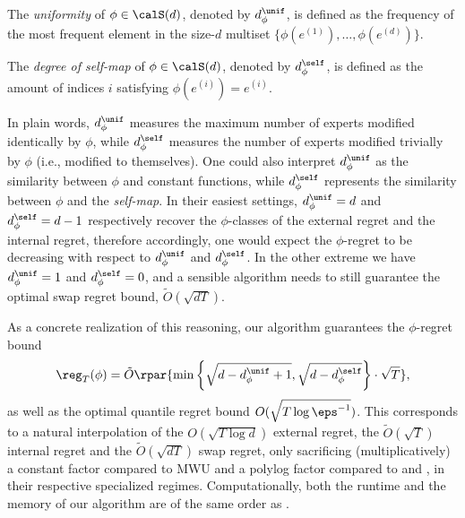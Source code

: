 \documentclass[10pt]{article}
\begin{document}
\begin{definition}[Uniformity]\label{definition:uniformity}
The \emph{uniformity} of $\phi\in\calS(d)$, denoted by $d^\unif_\phi$, is defined as the frequency of the most frequent element in the size-$d$ multiset $\{\phi(e^{(1)}),\ldots,\phi(e^{(d)})\}$. 
\end{definition}

\begin{definition}
The \emph{degree of self-map} of $\phi\in\calS(d)$, denoted by $d^\self_\phi$, is defined as the amount of indices $i$ satisfying $\phi(e^{(i)})=e^{(i)}$. 
\end{definition}

In plain words, $d^\unif_\phi$ measures the maximum number of experts modified identically by $\phi$, while $d^\self_\phi$ measures the number of experts modified trivially by $\phi$ (i.e., modified to themselves). One could also interpret $d^\unif_\phi$ as the similarity between $\phi$ and constant functions, while $d^\self_\phi$ represents the similarity between $\phi$ and the \emph{self-map}. In their easiest settings, $d^\unif_\phi=d$ and $d^\self_\phi=d-1$ respectively recover the $\phi$-classes of the external regret and the internal regret, therefore accordingly, one would expect the $\phi$-regret to be decreasing with respect to $d^\unif_\phi$ and $d^\self_\phi$. In the other extreme we have $d^\unif_\phi=1$ and $d^\self_\phi=0$, and a sensible algorithm needs to still guarantee the optimal swap regret bound, $\tilde O(\sqrt{dT})$. 

As a concrete realization of this reasoning, our algorithm guarantees the $\phi$-regret bound
\begin{equation*}
\reg_T(\phi)=\tilde O\rpar{\min\left\{\sqrt{d-d^\unif_\phi+1},\sqrt{d-d^\self_\phi}\right\}\cdot\sqrt{T}},
\end{equation*}
as well as the optimal quantile regret bound $O(\sqrt{T\log\eps^{-1}})$. This corresponds to a natural interpolation of the $O(\sqrt{T\log d})$ external regret, the $\tilde O(\sqrt{T})$ internal regret and the $\tilde O(\sqrt{dT})$ swap regret, only sacrificing (multiplicatively) a constant factor compared to MWU and a polylog factor compared to \citep[Chapter~4.4]{cesa2006prediction} and \citep{blum2007external}, in their respective specialized regimes. Computationally, both the runtime and the memory of our algorithm are of the same order as \citep{blum2007external}. 
\end{document}
